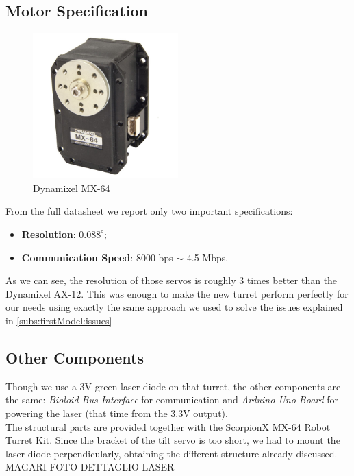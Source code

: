 \subsection{Motor Specification}
\begin{figure}
	\centering
	\includegraphics[width=0.5\textwidth]{img/mx64.jpg}%
	\caption{Dynamixel MX-64}
	\label{fig:mx64}
\end{figure}
From the full datasheet \cite{datasheet-MX64} we report only two important specifications:
\begin{itemize}
    \item \textbf{Resolution}: $0.088^{\circ}$;
    \item \textbf{Communication Speed}: 8000 bps $\sim$ 4.5 Mbps.
\end{itemize}
As we can see, the resolution of those servos is roughly 3 times better than the Dynamixel AX-12. This was enough to make the new turret perform perfectly for our needs using exactly the same approach we used to solve the issues explained in \ref{subs:firstModel:issues}
\subsection{Other Components}
Though we use a 3V green laser diode on that turret, the other components are the same: \emph{Bioloid Bus Interface} for communication and \emph{Arduino Uno Board} for powering the laser (that time from the 3.3V output).\\
The structural parts are provided together with the ScorpionX MX-64 Robot Turret Kit. Since the bracket of the tilt servo is too short, we had to mount the laser diode perpendicularly, obtaining the different structure already discussed. MAGARI FOTO DETTAGLIO LASER
